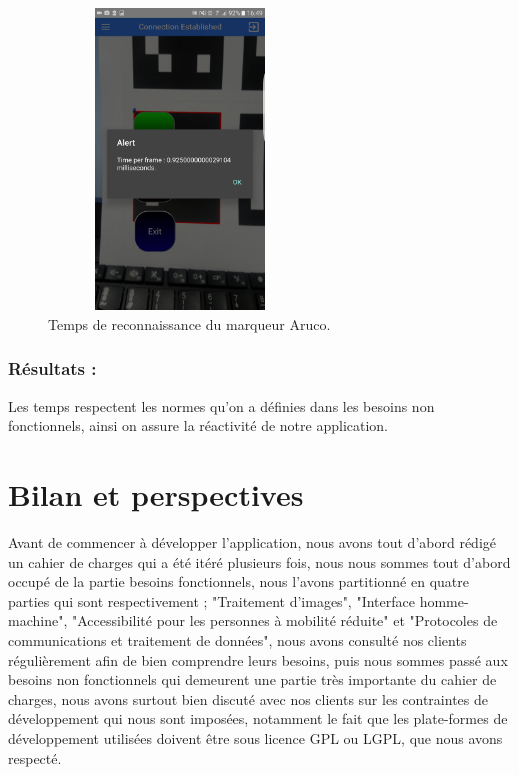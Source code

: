 \documentclass[12pt,a4paper]{article}
\begin{document}
\begin{figure}[H]
  \centering
    \includegraphics[width = 7cm,height=8cm]{12.png}
     \caption{Temps de reconnaissance du marqueur Aruco.}
     \label{fig28}
\end{figure}
\subsubsection{Résultats :}
Les temps respectent les normes qu'on a définies dans les besoins non fonctionnels, ainsi on assure la réactivité de notre application.
%
\section{Bilan et perspectives}

Avant de commencer à développer l'application, nous avons tout d'abord rédigé un cahier de charges qui a été itéré plusieurs fois, nous nous sommes tout d'abord occupé de la partie besoins fonctionnels, nous l'avons partitionné en quatre parties qui sont respectivement ; "Traitement d'images", "Interface homme-machine", "Accessibilité pour les personnes à mobilité réduite" et "Protocoles de communications et traitement de données", nous avons consulté nos clients régulièrement afin de bien comprendre leurs besoins, puis nous sommes passé aux besoins non fonctionnels qui demeurent une partie très importante du cahier de charges, nous avons surtout bien discuté avec nos clients sur les contraintes de développement qui nous sont imposées, notamment le fait que les plate-formes de développement utilisées doivent être sous licence GPL ou LGPL, que nous avons respecté.\par
\end{document}
